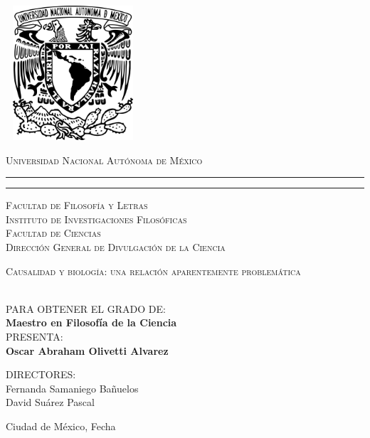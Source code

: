 \thispagestyle{empty}

\begin{center}

	\includegraphics[width=5cm, height=5cm]{Portada/escudo.png}

	{\scshape Universidad Nacional Aut\'onoma de M\'exico}
	\vspace{.3cm}
	\hrule height2.5pt
	\vspace{.1cm}
	\hrule height1pt
	\vspace{.3cm}
	\scshape{Facultad de Filosofía y Letras \\
			Instituto de Investigaciones Filosóficas \\
			Facultad de Ciencias \\
			Dirección General de Divulgación de la Ciencia}

		\vspace{0.5cm}

		{\Large \scshape {Causalidad y biología: una relación aparentemente problemática  }}

		\vspace{0.5cm}

		  \\[8pt]
		PARA OBTENER EL GRADO DE:\\[5pt]
		{\large \textbf{{Maestro en Filosofía de la Ciencia}}}\\[40pt]
		PRESENTA:\\[4pt]
		\textbf{{Oscar Abraham Olivetti Alvarez}}

		\vspace{0.5cm}

		{\small DIRECTORES:\\ {Fernanda Samaniego Bañuelos} \\ {David Suárez Pascal}}

		\vspace{0.5cm}

		{Ciudad de México,}{ }{Fecha}
\end{center}
